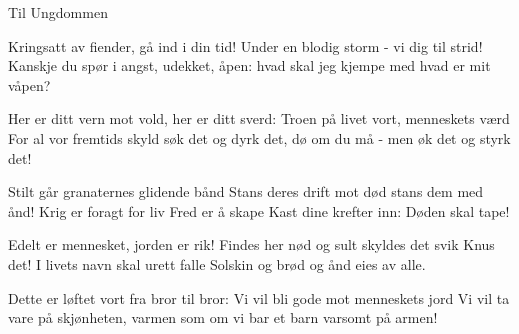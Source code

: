 \begin{sang}{Til Ungdommen}{}
\begin{vers}
Kringsatt av fiender,
gå ind i din tid!
Under en blodig storm -
vi dig til strid!
Kanskje du spør i angst,
udekket, åpen:
hvad skal jeg kjempe med
hvad er mit våpen?
\end{vers}
\begin{vers}
Her er ditt vern mot vold,
her er ditt sverd:
Troen på livet vort,
menneskets værd
For al vor fremtids skyld
søk det og dyrk det,
dø om du må - men
øk det og styrk det!
\end{vers}
\begin{vers}
Stilt går granaternes
glidende bånd
Stans deres drift mot død
stans dem med ånd!
Krig er foragt for liv
Fred er å skape
Kast dine krefter inn: 
Døden skal tape!
\end{vers}
\vspace{10cm}
\begin{vers}
Edelt er mennesket,
jorden er rik!
Findes her nød og sult
skyldes det svik
Knus det! I livets navn
skal urett falle
Solskin og brød og ånd 
eies av alle.
\end{vers}
\begin{vers}
Dette er løftet vort
fra bror til bror:
Vi vil bli gode mot
menneskets jord
Vi vil ta vare på
skjønheten, varmen
som om vi bar et barn
varsomt på armen!
\end{vers}
\laps
\end{sang}